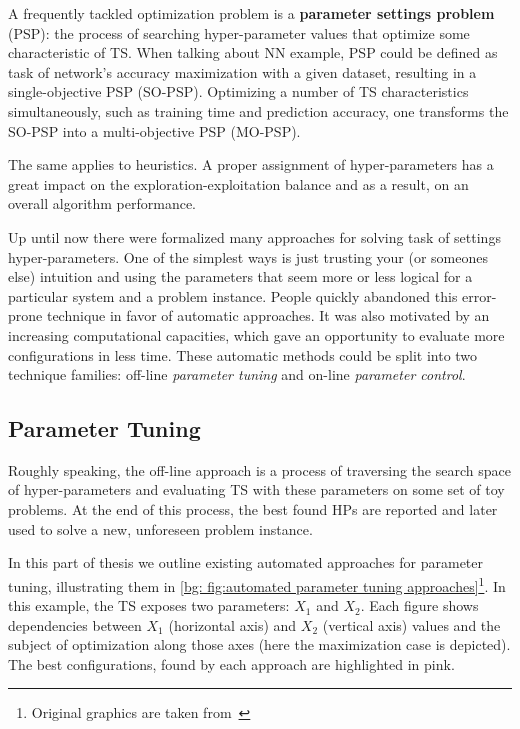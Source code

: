 A frequently tackled optimization problem is a \textbf{parameter settings problem} (PSP): the process of searching hyper-parameter values that optimize some characteristic of TS. When talking about NN example, PSP could be defined as task of network's accuracy maximization with a given dataset, resulting in a single-objective PSP (SO-PSP). Optimizing a number of TS characteristics simultaneously, such as training time and prediction accuracy, one transforms the SO-PSP into a multi-objective PSP (MO-PSP).

The same applies to heuristics. A proper assignment of hyper-parameters has a great impact on the exploration-exploitation balance and as a result, on an overall algorithm performance.

Up until now there were formalized many approaches for solving task of settings hyper-parameters. 
One of the simplest ways is just trusting your (or someones else) intuition and using the parameters that seem more or less logical for a particular system and a problem instance. People quickly abandoned this error-prone technique in favor of automatic approaches. It was also motivated by an increasing computational capacities, which gave an opportunity to evaluate more configurations in less time. These automatic methods could be split into two technique families: off-line \emph{parameter tuning} and on-line \emph{parameter control}.


\subsection{Parameter Tuning}\label{bg: parameter tuning}
Roughly speaking, the off-line approach is a process of traversing the search space of hyper-parameters and evaluating TS with these parameters on some set of toy problems. At the end of this process, the best found HPs are reported and later used to solve a new, unforeseen problem instance.

In this part of thesis we outline existing automated approaches for parameter tuning, illustrating them in \cref{bg: fig:automated parameter tuning approaches}\footnote{Original graphics are taken from~\cite{koch2017automated}}. In this example, the TS exposes two parameters: $X_1$ and $X_2$. Each figure shows dependencies between $X_1$ (horizontal axis) and $X_2$ (vertical axis) values and the subject of optimization along those axes (here the maximization case is depicted). The best configurations, found by each approach are highlighted in pink.

